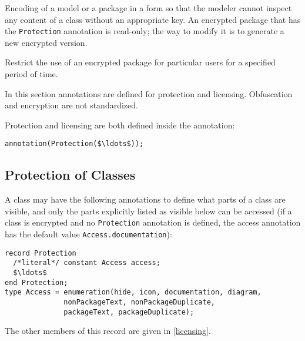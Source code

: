 \begin{definition}[Encryption]
Encoding of a model or a package in a form so that the modeler cannot inspect any content of a class without an appropriate key.
An encrypted package that has the \lstinline!Protection! annotation is read-only; the way to modify it is to generate a new encrypted version.
\end{definition}

\begin{definition}[Licensing]
Restrict the use of an encrypted package for particular users for a specified period of time.
\end{definition}

In this section annotations are defined for protection and licensing.
Obfuscation and encryption are not standardized.

Protection and licensing are both defined inside the  annotation:
\begin{lstlisting}[language=modelica]
annotation(Protection($\ldots$));
\end{lstlisting}

\subsection{Protection of Classes}\label{protection-of-classes}

A class may have the following annotations to define what parts of a class are visible, and only the parts explicitly listed as visible below can be accessed (if a class is encrypted and no \lstinline!Protection! annotation is defined, the access annotation has the default value \lstinline!Access.documentation!):
\begin{lstlisting}[language=modelica]
record Protection
  /*literal*/ constant Access access;
  $\ldots$
end Protection;
type Access = enumeration(hide, icon, documentation, diagram,
              nonPackageText, nonPackageDuplicate,
              packageText, packageDuplicate);
\end{lstlisting}
The other members of this record are given in \cref{licensing}.

